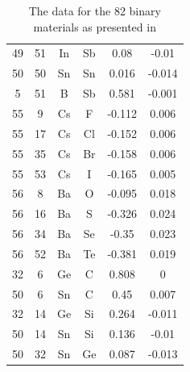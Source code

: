 \documentclass[11pt,oneside,czech,american]{book} %
\theoremstyle{plain}
\theoremstyle{definition}
\begin{document}
\begin{table}
\begin{minipage}{0.5\textwidth}
\begin{tabular}{cccccc}
			49 &    51 & In  & Sb  &  0.08  & -0.01  \\
			50 &    50 & Sn  & Sn  &  0.016 & -0.014 \\
			5 &    51 & B   & Sb  &  0.581 & -0.001 \\
			55 &     9 & Cs  & F   & -0.112 &  0.006 \\
			55 &    17 & Cs  & Cl  & -0.152 &  0.006 \\
			55 &    35 & Cs  & Br  & -0.158 &  0.006 \\
			55 &    53 & Cs  & I   & -0.165 &  0.005 \\
			56 &     8 & Ba  & O   & -0.095 &  0.018 \\
			56 &    16 & Ba  & S   & -0.326 &  0.024 \\
			56 &    34 & Ba  & Se  & -0.35  &  0.023 \\
			56 &    52 & Ba  & Te  & -0.381 &  0.019 \\
			32 &     6 & Ge  & C   &  0.808 &  0     \\
			50 &     6 & Sn  & C   &  0.45  &  0.007 \\
			32 &    14 & Ge  & Si  &  0.264 & -0.011 \\
			50 &    14 & Sn  & Si  &  0.136 & -0.01  \\
			50 &    32 & Sn  & Ge  &  0.087 & -0.013 \\
			\bottomrule
		\end{tabular}
		
	\end{minipage}
\caption{The data for the 82 binary materials as presented in \parencite{ghiringhelli15_supplementary}}
\end{table}
\end{document}

